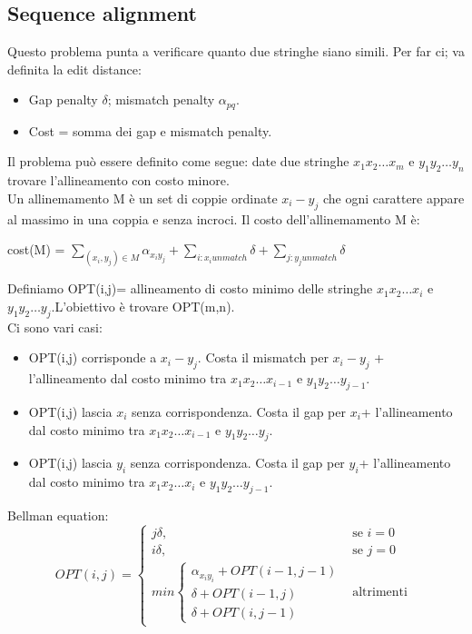 \documentclass{article}
\begin{document}
\subsection{Sequence alignment}
Questo problema punta a verificare quanto due stringhe siano simili. Per far ci; va definita la edit distance:
\begin{itemize}
    \item Gap penalty $\delta$; mismatch penalty $\alpha_{pq}$.
    \item Cost = somma dei gap e mismatch penalty.
\end{itemize}
Il problema può essere definito come segue: date due stringhe $x_1 x_2 \dots x_m$ e $y_1 y_2 \dots y_n$ trovare l'allineamento con costo minore.\\
Un allinemamento M è un set di coppie ordinate $x_i - y_j$ che ogni carattere appare al massimo in una coppia e senza incroci. Il costo dell'allinemamento M è:
\begin{center}
    cost(M) = $\sum_{(x_i,y_j)\in M}\alpha_{x_iy_j}+\sum_{i:x_i unmatch}\delta + \sum_{j:y_j unmatch}\delta$
\end{center}
Definiamo OPT(i,j)= allineamento di costo minimo delle stringhe $x_1 x_2 \dots x_i$ e $y_1 y_2 \dots y_j$.L'obiettivo è trovare OPT(m,n).\\
Ci sono vari casi:
\begin{itemize}
    \item OPT(i,j) corrisponde a $x_i-y_j$. Costa il mismatch per $x_i-y_j$ + l'allineamento dal costo minimo tra $x_1 x_2 \dots x_{i-1}$ e $y_1 y_2 \dots y_{j-1}$.
    \item OPT(i,j) lascia $x_i$ senza corrispondenza. Costa il gap per $x_i$+ l'allineamento dal costo minimo tra $x_1 x_2 \dots x_{i-1}$ e $y_1 y_2 \dots y_{j}$.
    \item OPT(i,j) lascia $y_i$ senza corrispondenza. Costa il gap per $y_i$+ l'allineamento dal costo minimo tra $x_1 x_2 \dots x_{i}$ e $y_1 y_2 \dots y_{j-1}$.
\end{itemize}
Bellman equation:\\
\[
OPT(i, j) =\begin{cases} j\delta, & \mbox{se }i=0 \\ i\delta, & \mbox{se }j=0 \\ min\begin{cases}
    \alpha_{x_iy_i}+OPT(i-1,j-1)\\ \delta + OPT(i-1,j) \\ \delta + OPT(i,j-1)
\end{cases} & \mbox{altrimenti }
\end{cases}
\]
\end{document}
